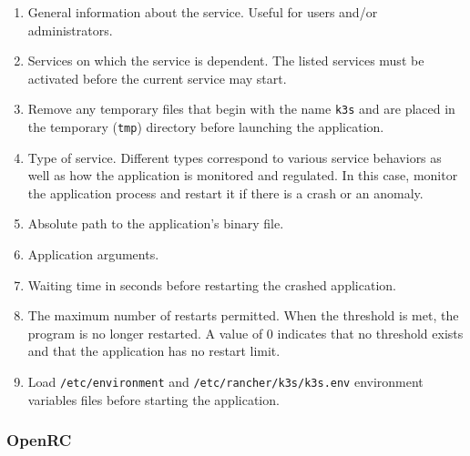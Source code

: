 \begin{enumerate}[label=\protect\circled{\arabic{*}}]
  \item General information about the service.
    \newline
    Useful for users and/or administrators.

  \item Services on which the service is dependent.
    \newline
    The listed services must be activated before the current service may start.

  \item Remove any temporary files that begin with the name \texttt{k3s} and are
    placed in the temporary (\texttt{tmp}) directory before launching the application.

  \item Type of service. Different types correspond to various service behaviors
    as well as how the application is monitored and regulated.
    \newline
    In this case, monitor the application process and restart it if there is a
    crash or an anomaly.

  \item Absolute path to the application's binary file.

  \item Application arguments.

  \item Waiting time in seconds before restarting the crashed application.

  \item The maximum number of restarts permitted. When the threshold is met, the
    program is no longer restarted.
    \newline
    A value of 0 indicates that no threshold exists and that the application has
    no restart limit.

  \item Load \texttt{/etc/environment} and \texttt{/etc/rancher/k3s/k3s.env} environment
    variables files before starting the application.
\end{enumerate}

\subsubsection{OpenRC}
\label{subsec:implementation_distributions_init_system_openrc}

